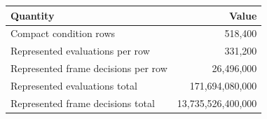 \begin{tabular}{lr}
\toprule
Quantity & Value \\
\midrule
Compact condition rows & 518,400 \\
Represented evaluations per row & 331,200 \\
Represented frame decisions per row & 26,496,000 \\
Represented evaluations total & 171,694,080,000 \\
Represented frame decisions total & 13,735,526,400,000 \\
\bottomrule
\end{tabular}

